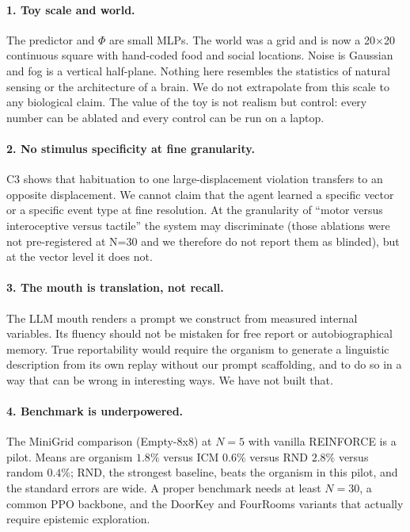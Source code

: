\documentclass[11pt,a4paper]{article}
\begin{document}
\paragraph{1. Toy scale and world.} The predictor and $\Phi$ are small MLPs. The world was a grid and is now a 20$\times$20 continuous square with hand-coded food and social locations. Noise is Gaussian and fog is a vertical half-plane. Nothing here resembles the statistics of natural sensing or the architecture of a brain. We do not extrapolate from this scale to any biological claim. The value of the toy is not realism but control: every number can be ablated and every control can be run on a laptop.

\paragraph{2. No stimulus specificity at fine granularity.} C3 shows that habituation to one large-displacement violation transfers to an opposite displacement. We cannot claim that the agent learned a specific vector or a specific event type at fine resolution. At the granularity of ``motor versus interoceptive versus tactile'' the system may discriminate (those ablations were not pre-registered at N=30 and we therefore do not report them as blinded), but at the vector level it does not.

\paragraph{3. The mouth is translation, not recall.} The LLM mouth renders a prompt we construct from measured internal variables. Its fluency should not be mistaken for free report or autobiographical memory. True reportability would require the organism to generate a linguistic description from its own replay without our prompt scaffolding, and to do so in a way that can be wrong in interesting ways. We have not built that.

\paragraph{4. Benchmark is underpowered.} The MiniGrid comparison (Empty-8x8) at $N=5$ with vanilla REINFORCE is a pilot. Means are organism $1.8\%$ versus ICM $0.6\%$ versus RND $2.8\%$ versus random $0.4\%$; RND, the strongest baseline, beats the organism in this pilot, and the standard errors are wide. A proper benchmark needs at least $N=30$, a common PPO backbone, and the DoorKey and FourRooms variants that actually require epistemic exploration.
\end{document}
